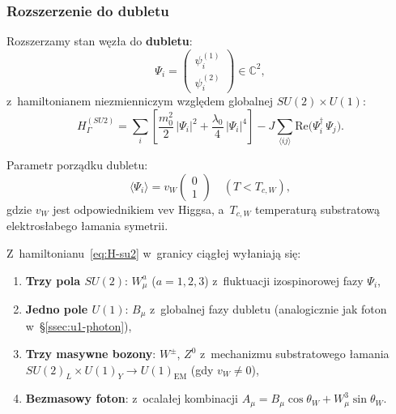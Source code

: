 \subsubsection{Rozszerzenie do dubletu}

\begin{axiom}\label{ax:su2-substrate}
Rozszerzamy stan węzła do \textbf{dubletu}:
\begin{equation}\label{eq:doublet-state}
    \Psi_i = \begin{pmatrix} \psi_i^{(1)} \\ \psi_i^{(2)} \end{pmatrix}
    \in \mathbb{C}^2,
\end{equation}
z~hamiltonianem niezmienniczym względem globalnej $SU(2) \times U(1)$:
\begin{equation}\label{eq:H-su2}
    H_\Gamma^{(SU2)} = \sum_i \left[
        \frac{m_0^2}{2}\,|\Psi_i|^2
        + \frac{\lambda_0}{4}\,|\Psi_i|^4
    \right]
    - J\sum_{\langle ij\rangle} \mathrm{Re}
      \bigl(\Psi_i^\dagger\,\Psi_j\bigr).
\end{equation}
\end{axiom}

Parametr porządku dubletu:
\begin{equation}\label{eq:doublet-order}
    \langle\Psi_i\rangle
    = v_W\begin{pmatrix} 0 \\ 1 \end{pmatrix}
    \quad (T < T_{c,W}),
\end{equation}
gdzie $v_W$ jest odpowiednikiem vev Higgsa, a~$T_{c,W}$ temperaturą
substratową elektrosłabego łamania symetrii.

\begin{theorem}\label{thm:su2-emergence}
Z~hamiltonianu~\eqref{eq:H-su2} w~granicy ciągłej wyłaniają się:
\begin{enumerate}[nosep]
    \item \textbf{Trzy pola $SU(2)$}: $W_\mu^a$ ($a = 1,2,3$)
          z~fluktuacji izospinorowej fazy $\Psi_i$,
    \item \textbf{Jedno pole $U(1)$}: $B_\mu$ z~globalnej
          fazy dubletu (analogicznie jak foton w~\S\ref{ssec:u1-photon}),
    \item \textbf{Trzy masywne bozony}: $W^\pm$, $Z^0$
          z~mechanizmu substratowego łamania $SU(2)_L \times U(1)_Y
          \to U(1)_{\mathrm{EM}}$ (gdy $v_W \neq 0$),
    \item \textbf{Bezmasowy foton}: z~ocalałej kombinacji
          $A_\mu = B_\mu\cos\theta_W + W_\mu^3\sin\theta_W$.
\end{enumerate}
\end{theorem}

